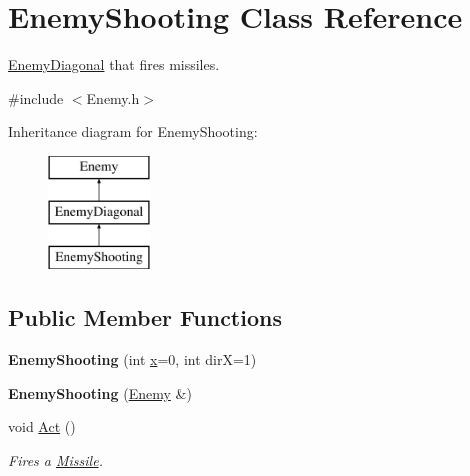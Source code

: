 \hypertarget{class_enemy_shooting}{}\section{Enemy\+Shooting Class Reference}
\label{class_enemy_shooting}


\hyperlink{class_enemy_diagonal}{Enemy\+Diagonal} that fires missiles.  




{\ttfamily \#include $<$Enemy.\+h$>$}

Inheritance diagram for Enemy\+Shooting\+:\begin{figure}[H]
\begin{center}
\leavevmode
\includegraphics[height=3.000000cm]{class_enemy_shooting}
\end{center}
\end{figure}
\subsection*{Public Member Functions}
\begin{DoxyCompactItemize}
\item 
\mbox{\label{class_enemy_shooting_aa66f1d05c29246f1904e8ebf9e25ca65}} 
{\bfseries Enemy\+Shooting} (int \hyperlink{class_enemy_a05e9e91e87d6eae0da31cc6d78a0b43d}{x}=0, int dirX=1)
\item 
\mbox{\label{class_enemy_shooting_abee255a2e67785aab7bf7f6fb67d4ec9}} 
{\bfseries Enemy\+Shooting} (\hyperlink{class_enemy}{Enemy} \&)
\item 
\mbox{\label{class_enemy_shooting_ad1b0698807426c5d5e337aca745111dc}} 
void \hyperlink{class_enemy_shooting_ad1b0698807426c5d5e337aca745111dc}{Act} ()
\begin{DoxyCompactList}\small\item\em Fires a \hyperlink{class_missile}{Missile}. \end{DoxyCompactList}\end{DoxyCompactItemize}
